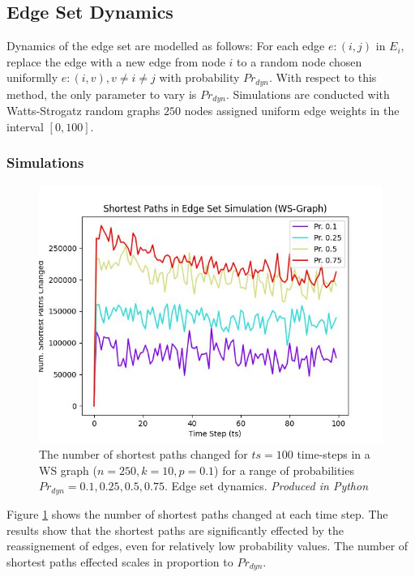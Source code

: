 \documentclass[
	a4paper, %
	10pt, %
	unnumberedsections, %
	twoside, %
]{LTJournalArticle}
\begin{document}
\subsection{Edge Set Dynamics}
Dynamics of the edge set are modelled as follows: For each edge \(e: (i, j)\) in \(E_{i}\), replace the edge with a new edge from node \(i\) to a random node chosen uniformlly \(e: (i, v), v \neq i \neq j\) with probability \(Pr_{dyn}\). With respect to this method, the only parameter to vary is \(Pr_{dyn}\). Simulations are conducted with Watts-Strogatz random graphs \(250\) nodes assigned uniform edge weights in the interval \([0, 100]\). \\

\subsubsection{Simulations}

\begin{figure}[H]
	\includegraphics[width=\linewidth]{Figures/esd/paths.jpg}
	\caption{The number of shortest paths changed for \(ts = 100\) time-steps in a WS graph (\(n = 250, k = 10, p = 0.1\)) for a range of probabilities \(Pr_{dyn} = 0.1, 0.25, 0.5, 0.75\). Edge set dynamics. \emph{Produced in Python}}
	\label{fig:esd_paths}
\end{figure}

Figure \ref{fig:esd_paths} shows the number of shortest paths changed at each time step. The results show that the shortest paths are significantly effected by the reassignement of edges, even for relatively low probability values. The number of shortest paths effected scales in proportion to \(Pr_{dyn}\).  \\
\end{document}
